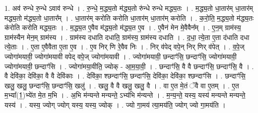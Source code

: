 \documentclass[17pt]{extarticle}
\begin{document}
1. अव॑ रुन्धे रु॒न्धे ऽवाव॑ रुन्धे । . रु॒न्धे॒ म॒द्ध्य॒तो म॑द्ध्य॒तो रु॑न्धे रुन्धे मद्ध्य॒तः । . म॒द्ध्य॒तो धा॒तार॑म् धा॒तार॑म् मद्ध्य॒तो म॑द्ध्य॒तो धा॒तार᳚म् । . धा॒तार॑म् करोति करोति धा॒तार॑म् धा॒तार॑म् करोति । . क॒रो॒ति॒ म॒द्ध्य॒तो म॑द्ध्य॒तः क॑रोति करोति मद्ध्य॒तः । . म॒द्ध्य॒त ए॒वैव म॑द्ध्य॒तो म॑द्ध्य॒त ए॒व । . ए॒वैन॑ मेन मे॒वैवैन᳚म् । . ए॒न॒म् ग्राम॑स्य॒ ग्राम॑स्यैन मेन॒म् ग्राम॑स्य । . ग्राम॑स्य दधाति दधाति॒ ग्राम॑स्य॒ ग्राम॑स्य दधाति । . द॒धा॒ त्ये॒ता ए॒ता द॑धाति दधा त्ये॒ताः । . ए॒ता ए॒वैवैता ए॒ता ए॒व । . ए॒व निर् णि रे॒वैव निः । . निर् व॑पेद् वपे॒न् निर् णिर् व॑पेत् । . व॒पे॒ज् ज्योगा॑मयावी॒ ज्योगा॑मयावी वपेद् वपे॒ज् ज्योगा॑मयावी । . ज्योगा॑मयावी॒ छन्दाꣳ॑सि॒ छन्दाꣳ॑सि॒ ज्योगा॑मयावी॒ ज्योगा॑मयावी॒ छन्दाꣳ॑सि । . ज्योगा॑मया॒वीति॒ ज्योक् - आ॒म॒या॒वी॒ । . छन्दाꣳ॑सि॒ वै वै छन्दाꣳ॑सि॒ छन्दाꣳ॑सि॒ वै । . वै देवि॑का॒ देवि॑का॒ वै वै देवि॑काः । . देवि॑का॒ श्छन्दाꣳ॑सि॒ छन्दाꣳ॑सि॒ देवि॑का॒ देवि॑का॒ श्छन्दाꣳ॑सि । . छन्दाꣳ॑सि॒ खलु॒ खलु॒ छन्दाꣳ॑सि॒ छन्दाꣳ॑सि॒ खलु॑ । . खलु॒ वै वै खलु॒ खलु॒ वै । . वा ए॒त मे॒तं ॅवै वा ए॒तम् । . ए॒त म॒भ्या᳚(1॒)भ्ये॑त मे॒त म॒भि । . अ॒भि म॑न्यन्ते मन्यन्ते॒ ऽभ्य॑भि म॑न्यन्ते । . म॒न्य॒न्ते॒ यस्य॒ यस्य॑ मन्यन्ते मन्यन्ते॒ यस्य॑ । . यस्य॒ ज्योग् ज्योग् यस्य॒ यस्य॒ ज्योक् । . ज्यो गा॒मय॑ त्या॒मय॑ति॒ ज्योग् ज्यो गा॒मय॑ति । \newline
\end{document}
